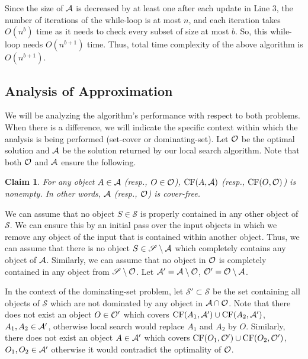 \documentclass[a4paper,11pt]{article}
\DeclareMathOperator{\CF}{CF}
\newtheorem{claim}{Claim}
\begin{document}
Since the size of ${\cal A}$ is decreased by at least one after each update in 
Line 3, 
 the number of iterations of the  while-loop is at most $n$, and
 each iteration takes $O(n^b)$ time as it needs to check every subset of size 
at most $b$.  So, this while-loop needs  $O(n^{b+1})$ time.  
Thus, total time complexity of  
the above algorithm is 
$O(n^{b+1})$.

\subsection{Analysis of Approximation}\label{anls}
 {We will be analyzing the algorithm's performance with respect to both problems. When there is a difference, we will indicate the specific context within which the analysis is being performed (set-cover or dominating-set). }
Let ${\cal O}$ be the optimal solution  and ${\cal A}$ 
be 
the solution 
returned by our local search algorithm. 
Note that both ${\cal O}$ and ${\cal A}$  ensure the following. 
\begin{claim}\label{cD0.0}
  {For any object $A\in  {\cal A}$ (resp., $O\in {\cal  O}$),  $\CF(A, {\cal A})$ (resp.,  $\CF(O, {\cal  O})$)  is nonempty. In other words, ${\cal A}$ (resp., ${\cal  O}$) is cover-free. } 
\end{claim}

We can assume that no object $S\in \mathscr{S}$ is properly contained in any other object of $\mathscr{S}$. We can ensure this by an initial pass over the input objects in which we remove any object of the input that is contained within another object. Thus, we can assume that there is no 
object $S\in 
\mathscr{S}\setminus {\cal A}$ which completely contains any object of ${\cal A}$. 
Similarly, we can 
assume that no object in ${\cal O}$ is completely contained in any object 
from 
$\mathscr{S}\setminus {\cal O}$.   Let ${\cal A}'={\cal A}\setminus {\cal O}$, ${\cal O}'={\cal O}\setminus 
{\cal A}$. 

In the context of the dominating-set problem,
let  $\mathscr{S}'\subset \mathscr{S}$ be the set containing  all objects of $\mathscr{S}$ which
are not dominated by any 
object in ${\cal A}\cap {\cal O}$. 
   Note that there does not exist an object $O\in {\cal O}'$ which covers $\CF(A_1, {\cal A}')\cup \CF(A_2, {\cal A}')$, $A_1,A_2\in {\cal A}'$, otherwise local search would replace  $A_1$ and $A_2$ by $O$. Similarly, there does not exist an object $A\in {\cal A}'$ which covers $\CF(O_1, {\cal O}')\cup \CF(O_2, {\cal O}')$, $O_1,O_2\in {\cal A}'$ otherwise it would contradict the optimality of ${\cal O}$.
\end{document}
